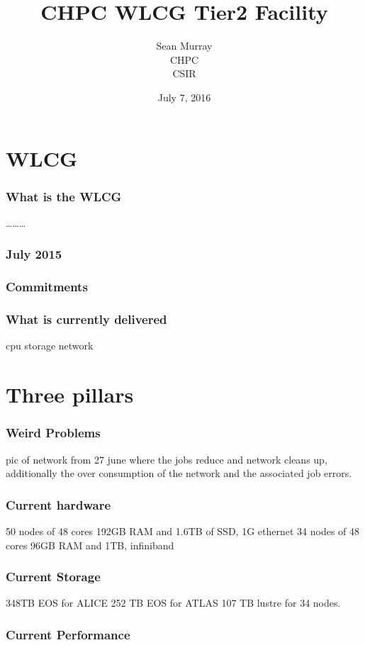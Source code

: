 \documentclass{beamer}
\title{CHPC WLCG Tier2 Facility}
\author{Sean Murray \\
    CHPC \\
    CSIR 
}
\date{July 7, 2016}
\begin{document}
\begin{frame}
\titlepage
\end{frame}

\section{WLCG}

\begin{frame}
\frametitle{What is the WLCG}

\ldots\ldots\ldots

\end{frame}

\begin{frame}
\frametitle{July 2015}

\end{frame}

\begin{frame}
\frametitle{Commitments}

\end{frame}

\begin{frame}
\frametitle{What is currently delivered}

cpu
storage
network
\end{frame}

\section{Three pillars}

\begin{frame}
\frametitle{Weird Problems}

pic of network from 27 june where the jobs reduce and network cleans up, additionally the over consumption of the network and the associated job errors.

\end{frame}

\begin{frame}
  \frametitle{Current hardware}
  50 nodes of 48 cores 192GB RAM and 1.6TB of SSD, 1G ethernet
  34 nodes of 48 cores 96GB RAM and 1TB, infiniband
\end{frame}

\begin{frame}
  \frametitle{Current Storage}
  348TB EOS for ALICE
  252 TB EOS for ATLAS
  107 TB lustre for 34 nodes.
\end{frame}

\begin{frame}
  \frametitle{Current Performance}

\end{frame}
\end{document}
